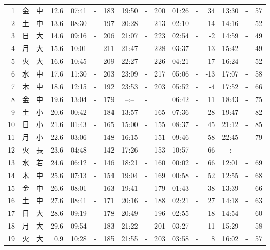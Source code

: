 \documentclass[12pt.a4j]{jsarticle}
\begin{document}
\begin{center}
\begin{table}[ht]
\begin{tabular}{|rc|cr|ccrccr|ccrccr|}
 \hline
 1 & 金 & 中 & 12.6 &  07:41 &-& 183  &  19:50 &-& 200  &   01:26 &-&  34  &   13:30 &-&  57  \\
 2 & 土 & 中 & 13.6 &  08:30 &-& 197  &  20:28 &-& 213  &   02:10 &-&  14  &   14:16 &-&  52  \\
 3 & 日 & 大 & 14.6 &  09:16 &-& 206  &  21:07 &-& 223  &   02:54 &-&  -2  &   14:59 &-&  49  \\
 4 & 月 & 大 & 15.6 &  10:01 &-& 211  &  21:47 &-& 228  &   03:37 &-& -13  &   15:42 &-&  49  \\
 5 & 火 & 大 & 16.6 &  10:45 &-& 209  &  22:27 &-& 226  &   04:21 &-& -17  &   16:24 &-&  52  \\
 6 & 水 & 中 & 17.6 &  11:30 &-& 203  &  23:09 &-& 217  &   05:06 &-& -13  &   17:07 &-&  58  \\
 7 & 木 & 中 & 18.6 &  12:15 &-& 192  &  23:53 &-& 203  &   05:52 &-&  -4  &   17:52 &-&  66  \\
 8 & 金 & 中 & 19.6 &  13:04 &-& 179  &  --:-- &-&     &   06:42 &-&  11  &   18:43 &-&  75  \\
 9 & 土 & 小 & 20.6 &  00:42 &-& 184  &  13:57 &-& 165  &   07:36 &-&  28  &   19:47 &-&  82  \\
10 & 日 & 小 & 21.6 &  01:43 &-& 165  &  15:00 &-& 155  &   08:37 &-&  45  &   21:12 &-&  85  \\
11 & 月 & 小 & 22.6 &  03:06 &-& 148  &  16:15 &-& 151  &   09:46 &-&  58  &   22:45 &-&  79  \\
12 & 火 & 長 & 23.6 &  04:48 &-& 142  &  17:26 &-& 153  &   10:57 &-&  66  &   --:-- &-&     \\
13 & 水 & 若 & 24.6 &  06:12 &-& 146  &  18:21 &-& 160  &   00:02 &-&  66  &   12:01 &-&  69  \\
14 & 木 & 中 & 25.6 &  07:13 &-& 154  &  19:04 &-& 169  &   00:58 &-&  52  &   12:55 &-&  68  \\
15 & 金 & 中 & 26.6 &  08:01 &-& 163  &  19:41 &-& 179  &   01:43 &-&  38  &   13:39 &-&  66  \\
16 & 土 & 中 & 27.6 &  08:41 &-& 171  &  20:16 &-& 188  &   02:21 &-&  27  &   14:18 &-&  63  \\
17 & 日 & 大 & 28.6 &  09:19 &-& 178  &  20:49 &-& 196  &   02:55 &-&  18  &   14:54 &-&  60  \\
18 & 月 & 大 & 29.6 &  09:54 &-& 183  &  21:22 &-& 201  &   03:27 &-&  11  &   15:29 &-&  58  \\
19 & 火 & 大 &  0.9 &  10:28 &-& 185  &  21:55 &-& 203  &   03:58 &-&   8  &   16:02 &-&  57  \\

\end{tabular}
\end{table}
\end{center}
\end{document}
